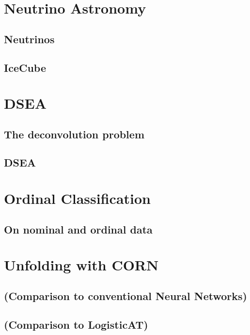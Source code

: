 
\chapter{Neutrino Astronomy}
     \section{Neutrinos}
     \section{IceCube}
\chapter{DSEA}
     \section{The deconvolution problem}
     \section{DSEA} %
\chapter{Ordinal Classification}
     \section{On nominal and ordinal data}
     
\chapter{Unfolding with CORN}
    
    
    
    \section{(Comparison to conventional Neural Networks)}
    \section{(Comparison to LogisticAT)}

